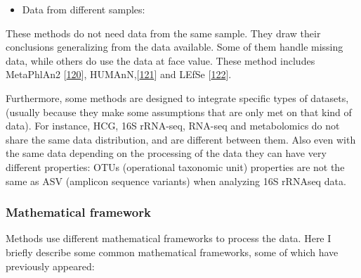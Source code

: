 \documentclass[
  12pt,
  a4paper,
  twoside,
  openright]{book}
\providecommand{\tightlist}{%
  \setlength{\itemsep}{0pt}\setlength{\parskip}{0pt}}
\begin{document}
\begin{itemize}
\tightlist
\item
  Data from different samples:
\end{itemize}

These methods do not need data from the same sample.
They draw their conclusions generalizing from the data available.
Some of them handle missing data, while others do use the data at face value.
These method includes MetaPhlAn2 {[}\protect\hyperlink{ref-franzosaSpecieslevelFunctionalProfiling2018}{120}{]}, HUMAnN,{[}\protect\hyperlink{ref-truongMetaPhlAn2EnhancedMetagenomic2015}{121}{]} and LEfSe {[}\protect\hyperlink{ref-segataMetagenomicBiomarkerDiscovery2011}{122}{]}.

Furthermore, some methods are designed to integrate specific types of datasets, (usually because they make some assumptions that are only met on that kind of data).
For instance, HCG, 16S rRNA-seq, RNA-seq and metabolomics do not share the same data distribution, and are different between them.
Also even with the same data depending on the processing of the data they can have very different properties: OTUs (operational taxonomic unit) properties are not the same as ASV (amplicon sequence variants) when analyzing 16S rRNAseq data.

\hypertarget{mathematical-framework}{%
\subsubsection{Mathematical framework}\label{mathematical-framework}}

Methods use different mathematical frameworks to process the data.
Here I briefly describe some common mathematical frameworks, some of which have previously appeared:
\end{document}
